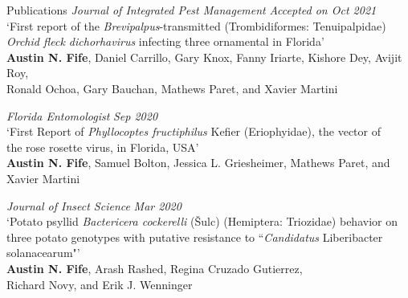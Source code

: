 \documentclass{resume} %
\begin{document}
\begin{rSection}{Publications}
\textit{Journal of Integrated Pest Management} \hfill {\em \textit{Accepted on Oct 2021}}\\
`First report of the \textit{Brevipalpus}-transmitted (Trombidiformes: Tenuipalpidae)\\
\textit{Orchid fleck dichorhavirus} infecting three ornamental in Florida'\\
\textbf{Austin N. Fife}, Daniel Carrillo, Gary Knox, Fanny Iriarte, Kishore Dey, Avijit Roy,\\
 Ronald Ochoa, Gary Bauchan, Mathews Paret, and Xavier Martini \hfill
 
\textit{Florida Entomologist} \hfill {\em \textit{Sep 2020}}\\
`First Report of \textit{Phyllocoptes fructiphilus} Kefier (Eriophyidae), the vector of\\
the rose rosette virus, in Florida, USA'\\
\textbf{Austin N. Fife}, Samuel Bolton, Jessica L. Griesheimer, Mathews Paret, and Xavier Martini \hfill

\textit{Journal of Insect Science} \hfill {\em \textit{Mar 2020}}\\
`Potato psyllid \textit{Bactericera cockerelli} (Šulc) (Hemiptera: Triozidae) behavior on\\
 three potato genotypes with putative resistance to ``\textit{Candidatus} Liberibacter solanacearum"'\\
\textbf{Austin N. Fife}, Arash Rashed, Regina Cruzado Gutierrez,\\ Richard Novy, and Erik J. Wenninger

\end{rSection}
\end{document}
